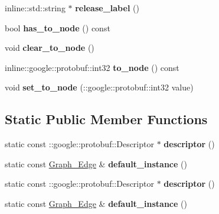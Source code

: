 \begin{DoxyCompactItemize}
\item 
\hypertarget{classgraph_1_1Graph__Edge_a932083f61d90db20cf811adaf02503fd}{
inline::std::string $\ast$ {\bfseries release\_\-label} ()}
\label{classgraph_1_1Graph__Edge_a932083f61d90db20cf811adaf02503fd}

\item 
\hypertarget{classgraph_1_1Graph__Edge_af80c945f9d34527de487207bc9553776}{
bool {\bfseries has\_\-to\_\-node} () const }
\label{classgraph_1_1Graph__Edge_af80c945f9d34527de487207bc9553776}

\item 
\hypertarget{classgraph_1_1Graph__Edge_a10c4766efe37b9ebf33d94e58f5d34d1}{
void {\bfseries clear\_\-to\_\-node} ()}
\label{classgraph_1_1Graph__Edge_a10c4766efe37b9ebf33d94e58f5d34d1}

\item 
\hypertarget{classgraph_1_1Graph__Edge_ae2c9acb9f4e76e8228947b44eba690f9}{
inline::google::protobuf::int32 {\bfseries to\_\-node} () const }
\label{classgraph_1_1Graph__Edge_ae2c9acb9f4e76e8228947b44eba690f9}

\item 
\hypertarget{classgraph_1_1Graph__Edge_a61b1469e26d71c6b2673a6a3da5a057f}{
void {\bfseries set\_\-to\_\-node} (::google::protobuf::int32 value)}
\label{classgraph_1_1Graph__Edge_a61b1469e26d71c6b2673a6a3da5a057f}

\end{DoxyCompactItemize}
\subsection*{Static Public Member Functions}
\begin{DoxyCompactItemize}
\item 
\hypertarget{classgraph_1_1Graph__Edge_ab32bdc6778944caff5d93501c0d8d202}{
static const ::google::protobuf::Descriptor $\ast$ {\bfseries descriptor} ()}
\label{classgraph_1_1Graph__Edge_ab32bdc6778944caff5d93501c0d8d202}

\item 
\hypertarget{classgraph_1_1Graph__Edge_aec4df3118608258ce28ce41b217abebf}{
static const \hyperlink{classgraph_1_1Graph__Edge}{Graph\_\-Edge} \& {\bfseries default\_\-instance} ()}
\label{classgraph_1_1Graph__Edge_aec4df3118608258ce28ce41b217abebf}

\item 
\hypertarget{classgraph_1_1Graph__Edge_a3123a39b6f9e2e2fac9035944ce1d589}{
static const ::google::protobuf::Descriptor $\ast$ {\bfseries descriptor} ()}
\label{classgraph_1_1Graph__Edge_a3123a39b6f9e2e2fac9035944ce1d589}

\item 
\hypertarget{classgraph_1_1Graph__Edge_a14f42efa9ab2cf6559077dd0fdd05f34}{
static const \hyperlink{classgraph_1_1Graph__Edge}{Graph\_\-Edge} \& {\bfseries default\_\-instance} ()}
\label{classgraph_1_1Graph__Edge_a14f42efa9ab2cf6559077dd0fdd05f34}

\end{DoxyCompactItemize}
